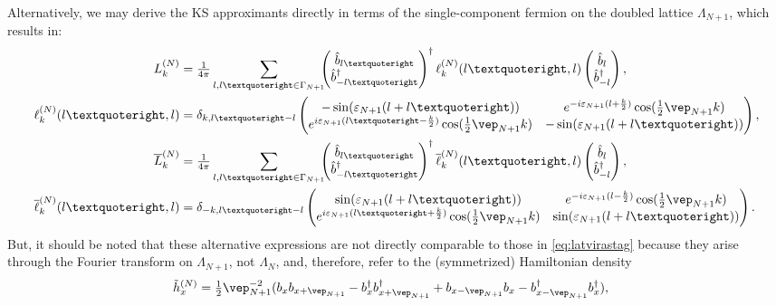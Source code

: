 \documentclass[a4paper, 11pt]{article}
\DeclareMathOperator{\1}{\mathds{1}}
\begin{document}
Alternatively, we may derive the KS approximants directly in terms of the single-component fermion on the doubled lattice $\Lambda_{N+1}$, which results in:
\begin{align}
\label{eq:latvirastag1c}
L_k^{(N)} & = \tfrac{1}{4\pi}\sum_{l,l’\in\Gamma_{N+1}} \!\!\! \begin{pmatrix} \hat{b}_{l’} \\ \hat{b}^{\dag}_{-l’} \end{pmatrix}^{\dag} \ell^{(N)}_{k}(l’,l) \begin{pmatrix} \hat{b}_{l} \\ \hat{b}^{\dag}_{-l} \end{pmatrix}, \\ \nonumber
\ell^{(N)}_{k}(l’,l) & = \delta_{k,l’-l} \begin{pmatrix} -\sin(\varepsilon_{N+1}(l+l’)) & e^{-i\varepsilon_{N+1}(l+\frac{k}{2})}\cos(\tfrac{1}{2}\vep_{N+1}k) \\ e^{i\varepsilon_{N+1}(l’-\frac{k}{2})}\cos(\tfrac{1}{2}\vep_{N+1}k) & -\sin(\varepsilon_{N+1}(l+l’)) \end{pmatrix}, \\ \nonumber
\overline{L}_k^{(N)} & = \tfrac{1}{4\pi}\sum_{l,l’\in\Gamma_{N+1}} \!\!\! \begin{pmatrix} \hat{b}_{l’} \\ \hat{b}^{\dag}_{-l’} \end{pmatrix}^{\dag} \overline{\ell}^{(N)}_{k}(l’,l) \begin{pmatrix} \hat{b}_{l} \\ \hat{b}^{\dag}_{-l} \end{pmatrix}, \\ \nonumber
\overline{\ell}^{(N)}_{k}(l’,l) & = \delta_{-k,l’-l} \begin{pmatrix} \sin(\varepsilon_{N+1}(l+l’)) & e^{-i\varepsilon_{N+1}(l-\frac{k}{2})}\cos(\tfrac{1}{2}\vep_{N+1}k) \\ e^{i\varepsilon_{N+1}(l’+\frac{k}{2})}\cos(\tfrac{1}{2}\vep_{N+1}k) & \sin(\varepsilon_{N+1}(l+l’)) \end{pmatrix}.
\end{align}
But, it should be noted that these alternative expressions are not directly comparable to those in \eqref{eq:latvirastag} because they arise through the Fourier transform on $\Lambda_{N+1}$, not $\Lambda_{N}$, and, therefore, refer to the (symmetrized) Hamiltonian density 
\begin{align*}
\tilde{h}^{(N)}_{x} & = \tfrac{1}{2}\vep_{N+1}^{-2}(b_{x}b_{x+\vep_{N+1}}-b^{\dag}_{x}b^{\dag}_{x+\vep_{N+1}}+b_{x-\vep_{N+1}}b_{x}-b^{\dag}_{x-\vep_{N+1}}b^{\dag}_{x}),
\end{align*}
\end{document}
